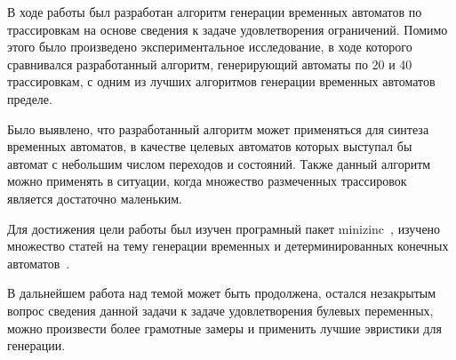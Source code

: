 \documentclass[times,specification,annotation]{itmo-student-thesis}
\begin{document}
\startconclusionpage

В ходе работы был разработан алгоритм генерации временных автоматов по трассировкам на основе сведения к задаче удовлетворения ограничений.
Помимо этого было произведено экспериментальное исследование, в ходе которого сравнивался разработанный алгоритм, генерирующий автоматы по 20 и 40 трассировкам, 
с одним из лучших алгоритмов генерации временных автоматов пределе.

Было выявлено, что разработанный алгоритм может применяться для синтеза временных автоматов, в качестве целевых автоматов которых выступал бы автомат с
небольшим числом переходов и состояний. Также данный алгоритм можно применять в ситуации, когда множество размеченных трассировок является достаточно маленьким.

Для достижения цели работы был изучен програмный пакет minizinc~\cite{minizinc}, изучено множество статей на тему генерации временных и детерминированных конечных
автоматов~\cite{state-merging-dfa, 1-dta, rti, timed-k-tail, rti-plus, moha, bfs}.

В дальнейшем работа над темой может быть продолжена, остался незакрытым вопрос сведения данной задачи к задаче удовлетворения булевых переменных,
можно произвести более грамотные замеры и применить лучшие эвристики для генерации.

\printmainbibliography

\appendix
\end{document}
